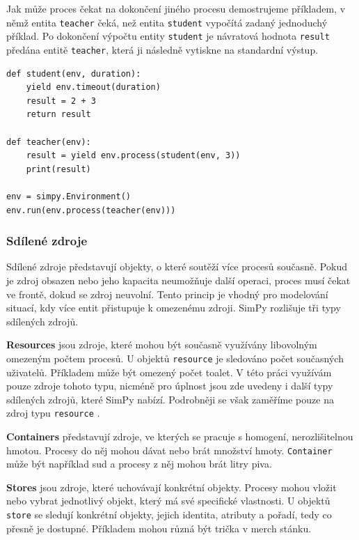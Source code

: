 \documentclass[
  program=itp,
  biblatex,
  figures=false,
  glossaries,
  index
]{kidiplom}
\begin{document}
Jak může proces čekat na dokončení jiného procesu demostrujeme příkladem, v němž entita \texttt{teacher} čeká, než entita \texttt{student} vypočítá zadaný jednoduchý příklad. Po dokončení výpočtu entity \texttt{student} je návratová hodnota \texttt{result} předána entitě \texttt{teacher}, která ji následně vytiskne na standardní výstup. 

\begin{verbatim}
def student(env, duration):
    yield env.timeout(duration)
    result = 2 + 3
    return result

def teacher(env):
    result = yield env.process(student(env, 3))
    print(result)

env = simpy.Environment()
env.run(env.process(teacher(env)))
\end{verbatim}

\subsubsection{Sdílené zdroje}

Sdílené zdroje představují objekty, o které soutěží více procesů současně. Pokud je zdroj obsazen nebo jeho kapacita neumožňuje další operaci, proces musí čekat ve frontě, dokud se zdroj neuvolní. Tento princip je vhodný pro modelování situací, kdy více entit přistupuje k omezenému zdroji. SimPy rozlišuje tři typy sdílených zdrojů.

\noindent \textbf{Resources} jsou zdroje, které mohou být současně využívány libovolným omezeným počtem procesů. U objektů \texttt{resource} je sledováno počet současných uživatelů. Příkladem může být omezený počet toalet. V této práci využívám pouze zdroje tohoto typu, nicméně pro úplnost jsou zde uvedeny i další typy sdílených zdrojů, které SimPy nabízí. Podrobněji se však zaměříme pouze na zdroj typu \texttt{resource} .

\noindent \textbf{Containers} představují zdroje, ve kterých se pracuje s homogení, nerozlišitelnou hmotou. Procesy do něj mohou dávat nebo brát množství hmoty. \texttt{Container} může být například sud a procesy z něj mohou brát litry piva. 

\noindent \textbf{Stores} jsou zdroje, které uchovávají konkrétní objekty. Procesy mohou vložit nebo vybrat jednotlivý objekt, který má své specifické vlastnosti. U objektů \texttt{store} se sledují konkrétní objekty, jejich identita, atributy a pořadí, tedy co přesně je dostupné. Příkladem mohou různá být trička v merch stánku.
\end{document}
